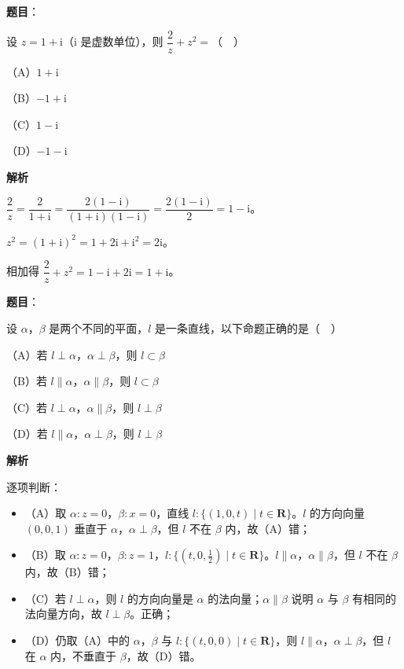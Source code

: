 \begin{answer}

\textbf{题目}：

设 $z=1+\mathrm i$（$\mathrm i$ 是虚数单位），则 $\dfrac2z+z^2=$（　）

（A）$1+\mathrm i$

（B）$-1+\mathrm i$

（C）$1-\mathrm i$

（D）$-1-\mathrm i$

\textbf{解析}

$\dfrac2z=\dfrac{2}{1+\mathrm i}=\dfrac{2(1-\mathrm i)}{(1+\mathrm i)(1-\mathrm i)}=\dfrac{2(1-\mathrm i)}2=1-\mathrm i$。

$z^2=(1+\mathrm i)^2=1+2\mathrm i+\mathrm i^2=2\mathrm i$。

相加得 $\dfrac2z+z^2=1-\mathrm i+2\mathrm i=1+\mathrm i$。


\end{answer}
\begin{answer}

\textbf{题目}：

设 $\alpha$，$\beta$ 是两个不同的平面，$l$ 是一条直线，以下命题正确的是（　）

（A）若 $l\perp\alpha$，$\alpha\perp\beta$，则 $l\subset\beta$

（B）若 $l\parallel\alpha$，$\alpha\parallel\beta$，则 $l\subset\beta$

（C）若 $l\perp\alpha$，$\alpha\parallel\beta$，则 $l\perp\beta$

（D）若 $l\parallel\alpha$，$\alpha\perp\beta$，则 $l\perp\beta$

\textbf{解析}

逐项判断：

\begin{itemize}
\item （A）取 $\alpha:z=0$，$\beta:x=0$，直线 $l:\{(1,0,t)\mid t\in\mathbf R\}$。$l$ 的方向向量 $(0,0,1)$ 垂直于 $\alpha$，$\alpha\perp\beta$，但 $l$ 不在 $\beta$ 内，故（A）错；
\item （B）取 $\alpha:z=0$，$\beta:z=1$，$l:\{(t,0,\tfrac12)\mid t\in\mathbf R\}$。$l\parallel\alpha$，$\alpha\parallel\beta$，但 $l$ 不在 $\beta$ 内，故（B）错；
\item （C）若 $l\perp\alpha$，则 $l$ 的方向向量是 $\alpha$ 的法向量；$\alpha\parallel\beta$ 说明 $\alpha$ 与 $\beta$ 有相同的法向量方向，故 $l\perp\beta$。正确；
\item （D）仍取（A）中的 $\alpha$，$\beta$ 与 $l:\{(t,0,0)\mid t\in\mathbf R\}$，则 $l\parallel\alpha$，$\alpha\perp\beta$，但 $l$ 在 $\alpha$ 内，不垂直于 $\beta$，故（D）错。
\end{itemize}


\end{answer}
